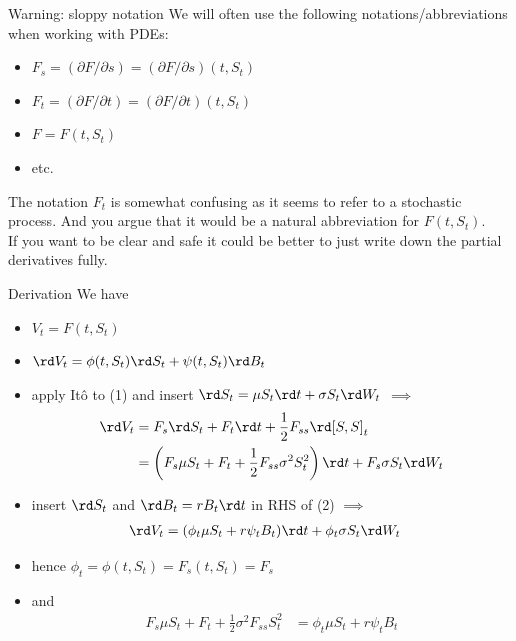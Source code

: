 \documentclass[pdf, handout]{beamer}
\begin{document}
\begin{frame}{Warning: sloppy notation}
We will often use the following notations/abbreviations when working with PDEs:
\begin{itemize}
\item $F_s = (\partial F / \partial s) = (\partial F / \partial s)(t,S_t)$
\item $F_t = (\partial F / \partial t) = (\partial F / \partial t)(t,S_t)$
\item $F = F(t,S_t)$
\item etc.
\end{itemize}
The notation $F_t$ is somewhat confusing as it seems to refer to a stochastic process. And you argue that it would be a natural abbreviation for $F(t,S_t)$. \\
If you want to be clear and safe it could be better to just write down the partial derivatives fully.
\end{frame}


\begin{frame}{Derivation}
We have
\begin{itemize}
\item[(1)] $V_t=F(t,S_t)$
\item[(2)] $\rd V_t= \phi(t,S_t) \rd S_t + \psi(t,S_t) \rd B_t$
\end{itemize}
\vspace{-.2cm}
\begin{itemize}
\item apply It\^{o} to (1) and insert $\rd S_t = \mu S_t \rd t + \sigma S_t \rd W_t$  $\implies$
\begin{align*}
\rd V_t &= F_s \rd S_t + F_t \rd t + \frac{1}{2} F_{ss} \rd [S,S]_t 
\\
&=  \left( F_s \mu S_t +F_t +  \frac{1}{2} F_{ss} \sigma^2 S_t^2  \right) 
\rd t + F_s \sigma S_t \rd W_t 
\end{align*}
\item insert $\rd S_t$ and $\rd B_t=rB_t\rd t$ in RHS of (2) $\implies$
\begin{align*}
\rd V_t &= (\phi_t \mu S_t + r\psi_t B_t) \rd t +  \phi_t \sigma S_t \rd W_t
\end{align*}
\item hence $\phi_t = \phi(t,S_t) = F_{s}(t,S_t)=F_s$
\item and
\begin{align*}
F_s \mu S_t +F_t +  \frac{1}{2}\sigma^2 F_{ss} S_t^2    
&= \phi_t \mu S_t + r\psi_t B_t
\end{align*}
\end{itemize}
\end{frame}
\end{document}
